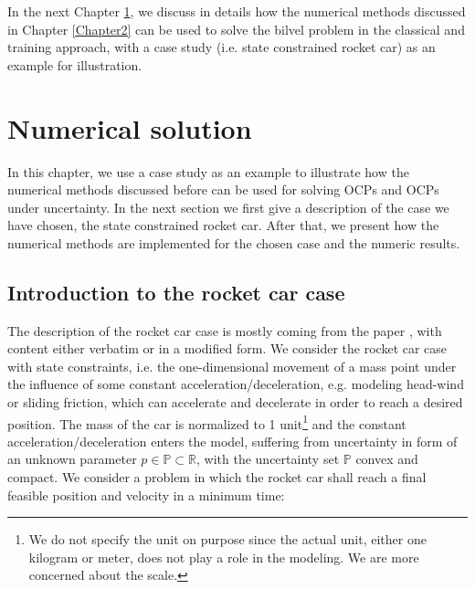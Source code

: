 \documentclass  [
  paper    = a4,
  BCOR     = 10mm,
  twoside,
  fontsize = 12pt,
  fleqn,
  toc      = bibnumbered,
  toc      = listofnumbered,
  numbers  = noendperiod,
  headings = normal,
  listof   = leveldown,
  version  = 3.03
]                                       {scrreprt}
\newcommand{\<}{\langle}
\renewcommand{\>}{\rangle}
\begin{document}
In the next Chapter \ref{Chapter4}, we discuss in details how the numerical methods discussed in Chapter \ref{Chapter2} can be used to solve the bilvel problem in the classical and training approach, with a case study (i.e. state constrained rocket car) as an example for illustration. 

\chapter{Numerical solution}
\label{Chapter4}
In this chapter, we use a case study as an example to illustrate how the numerical methods discussed before can be used for solving OCPs and OCPs under uncertainty. In the next section we first give a description of the case we have chosen, the state constrained rocket car. After that, we present how the numerical methods are implemented for the chosen case and the numeric results.  

\section{Introduction to the rocket car case}

The description of the rocket car case is mostly coming from the paper \cite{MatSch22}, with content either verbatim or in a modified form. We consider the rocket car case with state constraints, i.e. the one-dimensional movement of a mass point under the influence of some constant acceleration/deceleration, e.g. modeling head-wind or sliding friction, which can accelerate and decelerate in order to reach a desired position. The mass of the car is normalized to 1 unit\footnote{We do not specify the unit on purpose since the actual unit, either one kilogram or meter, does not play a role in the modeling. We are more concerned about the scale.} and the constant acceleration/deceleration enters the model, suffering from uncertainty in form of an unknown parameter $p \in  \mathbb{P} \subset \mathbb{R}$, with the uncertainty set $ \mathbb{P}$ convex and compact. We consider a problem in which the rocket car shall reach a final feasible position and velocity in a minimum time: 
\end{document}
